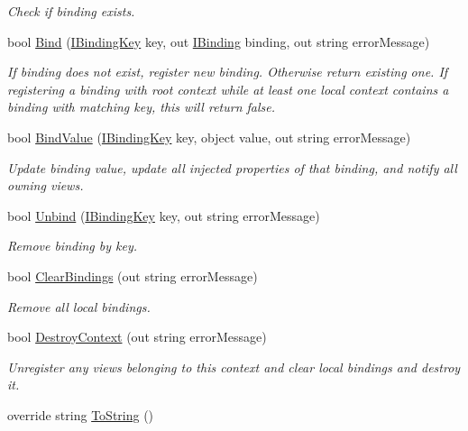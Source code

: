 \begin{DoxyCompactItemize}
\begin{DoxyCompactList}\small\item\em Check if binding exists. \end{DoxyCompactList}\item 
bool \mbox{\hyperlink{classcp_games_1_1core_1_1_rapid_m_v_c_1_1impl_1_1_context_ab1eb6b57dc793894038e54db71cd9f3c}{Bind}} (\mbox{\hyperlink{interfacecp_games_1_1core_1_1_rapid_m_v_c_1_1_i_binding_key}{I\+Binding\+Key}} key, out \mbox{\hyperlink{interfacecp_games_1_1core_1_1_rapid_m_v_c_1_1_i_binding}{I\+Binding}} binding, out string error\+Message)
\begin{DoxyCompactList}\small\item\em If binding does not exist, register new binding. Otherwise return existing one. If registering a binding with root context while at least one local context contains a binding with matching key, this will return false. \end{DoxyCompactList}\item 
bool \mbox{\hyperlink{classcp_games_1_1core_1_1_rapid_m_v_c_1_1impl_1_1_context_a7b95216e2e1d82d2623c0d8754883328}{Bind\+Value}} (\mbox{\hyperlink{interfacecp_games_1_1core_1_1_rapid_m_v_c_1_1_i_binding_key}{I\+Binding\+Key}} key, object value, out string error\+Message)
\begin{DoxyCompactList}\small\item\em Update binding value, update all injected properties of that binding, and notify all owning views. \end{DoxyCompactList}\item 
bool \mbox{\hyperlink{classcp_games_1_1core_1_1_rapid_m_v_c_1_1impl_1_1_context_a7cf9cfaa3957b4e48fdaccd726cbd8aa}{Unbind}} (\mbox{\hyperlink{interfacecp_games_1_1core_1_1_rapid_m_v_c_1_1_i_binding_key}{I\+Binding\+Key}} key, out string error\+Message)
\begin{DoxyCompactList}\small\item\em Remove binding by key. \end{DoxyCompactList}\item 
bool \mbox{\hyperlink{classcp_games_1_1core_1_1_rapid_m_v_c_1_1impl_1_1_context_a9b9addc7fdd8ac5f44c9ce5e5cd5e49d}{Clear\+Bindings}} (out string error\+Message)
\begin{DoxyCompactList}\small\item\em Remove all local bindings. \end{DoxyCompactList}\item 
bool \mbox{\hyperlink{classcp_games_1_1core_1_1_rapid_m_v_c_1_1impl_1_1_context_ab8b1ac2f255993564212c4055944f372}{Destroy\+Context}} (out string error\+Message)
\begin{DoxyCompactList}\small\item\em Unregister any views belonging to this context and clear local bindings and destroy it. \end{DoxyCompactList}\item 
override string \mbox{\hyperlink{classcp_games_1_1core_1_1_rapid_m_v_c_1_1impl_1_1_context_a665aa684d703ef7a67897c84274a494c}{To\+String}} ()
\end{DoxyCompactItemize}

